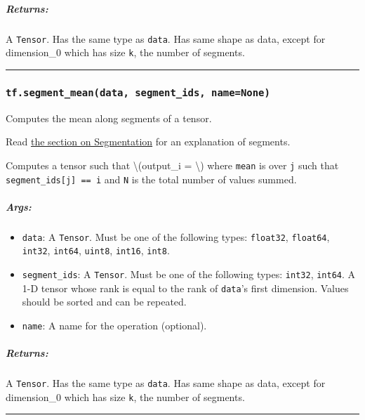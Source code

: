 \subparagraph{Returns: }\label{returns-49}

A \texttt{Tensor}. Has the same type as \texttt{data}. Has same shape as
data, except for dimension\_0 which has size \texttt{k}, the number of
segments.

\begin{center}\rule{0.5\linewidth}{\linethickness}\end{center}

\subsubsection{\texorpdfstring{\texttt{tf.segment\_mean(data,\ segment\_ids,\ name=None)}
}{tf.segment\_mean(data, segment\_ids, name=None) }}\label{tf.segmentux5fmeandata-segmentux5fids-namenone}

Computes the mean along segments of a tensor.

Read \href{../../api_docs/python/math_ops.md\#segmentation}{the section
on Segmentation} for an explanation of segments.

Computes a tensor such that \textbackslash{}(output\_i =
\textbackslash{}) where \texttt{mean} is over
\texttt{j} such that \texttt{segment\_ids{[}j{]}\ ==\ i} and \texttt{N}
is the total number of values summed.

\subparagraph{Args: }\label{args-50}

\begin{itemize}
\tightlist
\item
  \texttt{data}: A \texttt{Tensor}. Must be one of the following types:
  \texttt{float32}, \texttt{float64}, \texttt{int32}, \texttt{int64},
  \texttt{uint8}, \texttt{int16}, \texttt{int8}.
\item
  \texttt{segment\_ids}: A \texttt{Tensor}. Must be one of the following
  types: \texttt{int32}, \texttt{int64}. A 1-D tensor whose rank is
  equal to the rank of \texttt{data}'s first dimension. Values should be
  sorted and can be repeated.
\item
  \texttt{name}: A name for the operation (optional).
\end{itemize}

\subparagraph{Returns: }\label{returns-50}

A \texttt{Tensor}. Has the same type as \texttt{data}. Has same shape as
data, except for dimension\_0 which has size \texttt{k}, the number of
segments.

\begin{center}\rule{0.5\linewidth}{\linethickness}\end{center}

